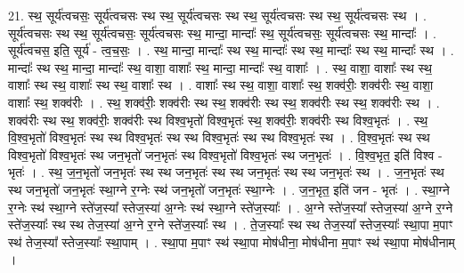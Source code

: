 \documentclass[17pt]{extarticle}
\begin{document}
21. स्थ॒ सूर्य॑त्वचसः॒ सूर्य॑त्वचसः स्थ स्थ॒ सूर्य॑त्वचसः स्थ स्थ॒ सूर्य॑त्वचसः स्थ स्थ॒ सूर्य॑त्वचसः स्थ । . सूर्य॑त्वचसः स्थ स्थ॒ सूर्य॑त्वचसः॒ सूर्य॑त्वचसः स्थ॒ मान्दा॒ मान्दाः᳚ स्थ॒ सूर्य॑त्वचसः॒ सूर्य॑त्वचसः स्थ॒ मान्दाः᳚ । . सूर्य॑त्वचस॒ इति॒ सूर्य॑ - त्व॒च॒सः॒ । . स्थ॒ मान्दा॒ मान्दाः᳚ स्थ स्थ॒ मान्दाः᳚ स्थ स्थ॒ मान्दाः᳚ स्थ स्थ॒ मान्दाः᳚ स्थ । . मान्दाः᳚ स्थ स्थ॒ मान्दा॒ मान्दाः᳚ स्थ॒ वाशा॒ वाशाः᳚ स्थ॒ मान्दा॒ मान्दाः᳚ स्थ॒ वाशाः᳚ । . स्थ॒ वाशा॒ वाशाः᳚ स्थ स्थ॒ वाशाः᳚ स्थ स्थ॒ वाशाः᳚ स्थ स्थ॒ वाशाः᳚ स्थ । . वाशाः᳚ स्थ स्थ॒ वाशा॒ वाशाः᳚ स्थ॒ शक्व॑रीः॒ शक्व॑रीः स्थ॒ वाशा॒ वाशाः᳚ स्थ॒ शक्व॑रीः । . स्थ॒ शक्व॑रीः॒ शक्व॑रीः स्थ स्थ॒ शक्व॑रीः स्थ स्थ॒ शक्व॑रीः स्थ स्थ॒ शक्व॑रीः स्थ । . शक्व॑रीः स्थ स्थ॒ शक्व॑रीः॒ शक्व॑रीः स्थ विश्व॒भृतो॑ विश्व॒भृतः॑ स्थ॒ शक्व॑रीः॒ शक्व॑रीः स्थ विश्व॒भृतः॑ । . स्थ॒ वि॒श्व॒भृतो॑ विश्व॒भृतः॑ स्थ स्थ विश्व॒भृतः॑ स्थ स्थ विश्व॒भृतः॑ स्थ स्थ विश्व॒भृतः॑ स्थ । . वि॒श्व॒भृतः॑ स्थ स्थ विश्व॒भृतो॑ विश्व॒भृतः॑ स्थ जन॒भृतो॑ जन॒भृतः॑ स्थ विश्व॒भृतो॑ विश्व॒भृतः॑ स्थ जन॒भृतः॑ । . वि॒श्व॒भृत॒ इति॑ विश्व - भृतः॑ । . स्थ॒ ज॒न॒भृतो॑ जन॒भृतः॑ स्थ स्थ जन॒भृतः॑ स्थ स्थ जन॒भृतः॑ स्थ स्थ जन॒भृतः॑ स्थ । . ज॒न॒भृतः॑ स्थ स्थ जन॒भृतो॑ जन॒भृतः॑ स्था॒ग्ने र॒ग्नेः स्थ॑ जन॒भृतो॑ जन॒भृतः॑ स्था॒ग्नेः । . ज॒न॒भृत॒ इति॑ जन - भृतः॑ । . स्था॒ग्ने र॒ग्नेः स्थ॑ स्था॒ग्ने स्ते॑ज॒स्या᳚ स्तेज॒स्या॑ अ॒ग्नेः स्थ॑ स्था॒ग्ने स्ते॑ज॒स्याः᳚ । . अ॒ग्ने स्ते॑ज॒स्या᳚ स्तेज॒स्या॑ अ॒ग्ने र॒ग्ने स्ते॑ज॒स्याः᳚ स्थ स्थ तेज॒स्या॑ अ॒ग्ने र॒ग्ने स्ते॑ज॒स्याः᳚ स्थ । . ते॒ज॒स्याः᳚ स्थ स्थ तेज॒स्या᳚ स्तेज॒स्याः᳚ स्था॒पा म॒पाꣳ स्थ॑ तेज॒स्या᳚ स्तेज॒स्याः᳚ स्था॒पाम् । . स्था॒पा म॒पाꣳ स्थ॑ स्था॒पा मोष॑धीना॒ मोष॑धीना म॒पाꣳ स्थ॑ स्था॒पा मोष॑धीनाम् । \newline
\end{document}
